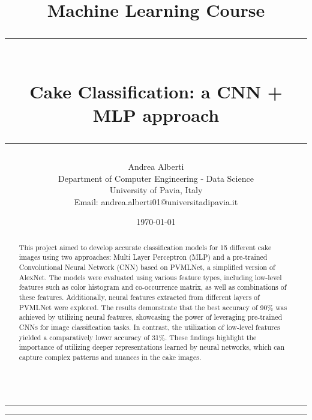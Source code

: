 \documentclass{article}
\title{\Large Machine Learning Course\vspace{0.8cm}\\
    \rule{\textwidth}{0.3pt}\vspace{0.3cm}\\
    \textbf{Cake Classification: a CNN + MLP approach}\vspace{0.1cm}\\
    \rule{\textwidth}{0.3pt}\vspace{0.8cm}}
\author{Andrea Alberti\vspace{0.5cm}\\
    \small Department of Computer Engineering - Data Science\\[0.2cm]
    \small University of Pavia, Italy \\
    \small Email: andrea.alberti01@universitadipavia.it}\vspace{0.5cm}
\date{\today}
\begin{document}
\begin{titlepage}
   
        \maketitle
        \thispagestyle{empty}

    \begin{multicols*}{2}
            
        \hrule
        \begin{abstract}
        \noindent
        This project aimed to develop accurate classification models for 15 different cake images using two approaches: Multi Layer Perceptron (MLP) and a pre-trained Convolutional Neural Network 
        (CNN) based on PVMLNet, a simplified version of AlexNet. The models were evaluated using various feature types, including low-level features such as color histogram and 
        co-occurrence matrix, as well as combinations of these features. Additionally, neural features extracted from different layers of PVMLNet were explored. 
        The results demonstrate that the best accuracy of 90\% was achieved by utilizing neural features, showcasing the power of leveraging pre-trained CNNs for image classification tasks. 
        In contrast, the utilization of low-level features yielded a comparatively lower accuracy of 31\%. These findings highlight the importance of utilizing deeper representations learned 
        by neural networks, which can capture complex patterns and nuances in the cake images. 
        \\
        \\
        \end{abstract}
     \newcolumn
        \hrule\vspace{0.1cm}
        \tableofcontents
    \end{multicols*}

\end{titlepage}

\newpage
{}



\end{document}
